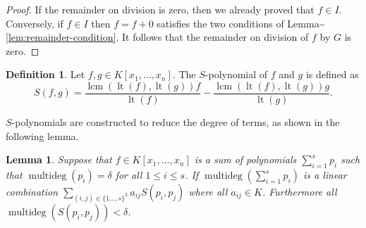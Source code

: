\documentclass[
]{book}
\newtheorem{lemma}{Lemma}[chapter]
\theoremstyle{definition}
\newtheorem{definition}{Definition}[chapter]
\theoremstyle{definition}
\theoremstyle{definition}
\theoremstyle{definition}
\theoremstyle{remark}
\begin{document}
\begin{proof}
If the remainder on division is zero, then we already proved that \(f \in I\).
Conversely, if \(f \in I\) then \(f = f+0\) satisfies the two conditions of Lemma\textasciitilde\ref{lem:remainder-condition}. It follows that the remainder on division of \(f\) by \(G\) is zero.
\end{proof}

\begin{definition}
Let \(f,g \in K[x_1,\ldots,x_n]\). The \(S\)-polynomial of \(f\) and \(g\) is defined as
\[
S(f,g) = \dfrac{\operatorname{lcm}(\operatorname{lt}(f),\operatorname{lt}(g))f}{\operatorname{lt}(f)} - \dfrac{\operatorname{lcm}(\operatorname{lt}(f),\operatorname{lt}(g))g}{\operatorname{lt}(g)}.
\]
\end{definition}

\(S\)-polynomials are constructed to reduce the degree of terms, as shown in the following lemma.

\begin{lemma}
\protect\hypertarget{lem:linear-combination}{}\label{lem:linear-combination}Suppose that \(f \in K[x_1,\ldots, x_n]\) is a sum of polynomials \(\sum_{i=1}^s p_i\) such that \(\operatorname{multideg}(p_i) = \delta\) for all \(1\le i \le s\).
If \(\operatorname{multideg}( \sum_{i=1}^s p_i )\) is a linear combination \(\sum_{(i,j) \in \{1\ldots,s\}^2} a_{ij} S(p_i,p_j)\) where all \(a_{ij} \in K\). Furthermore all \(\operatorname{multideg}(S(p_i,p_j)) < \delta\).
\end{lemma}
\end{document}
